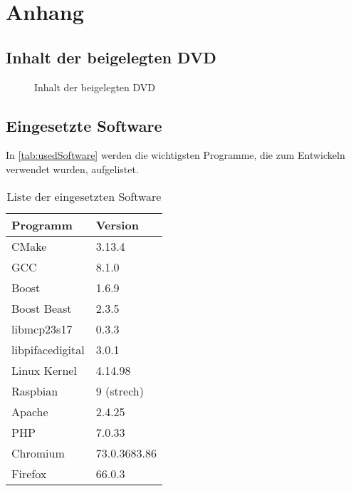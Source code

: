 \section{Anhang}\label{chp:anhang}
\subsection*{Inhalt der beigelegten DVD}
\begin{figure}[H]

\caption{Inhalt der beigelegten DVD}
\label{fig:cd}
\end{figure}

\subsection*{Eingesetzte Software}

In \autoref{tab:usedSoftware} werden die wichtigsten Programme, die zum Entwickeln verwendet wurden, aufgelistet.

\begin{table}[H]
\centering
\caption{Liste der eingesetzten Software}
\label{tab:usedSoftware}
\begin{tabular}{ll}
\hline
Programm       & Version      \\ \hline
CMake          & 3.13.4       \\
GCC            & 8.1.0        \\
Boost		   & 1.6.9		  \\
Boost Beast	   & 2.3.5		  \\
libmcp23s17    & 0.3.3		  \\
libpifacedigital & 3.0.1      \\
Linux Kernel   & 4.14.98      \\
Raspbian 	   & 9 (strech)   \\
Apache 		   & 2.4.25       \\
PHP			   & 7.0.33		  \\
Chromium       & 73.0.3683.86 \\
Firefox        & 66.0.3       \\

\end{tabular}
\end{table}

